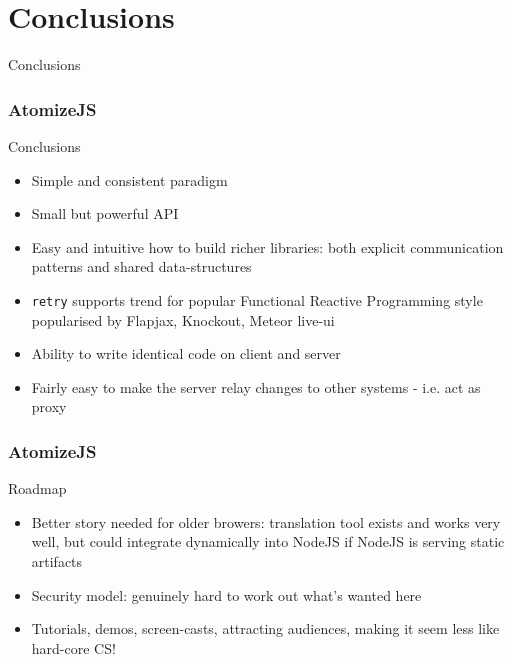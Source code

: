 \documentclass{beamer}
\begin{document}
\section{Conclusions}

\begin{frame}
  \centering
  \LARGE

  Conclusions

\end{frame}

\begin{frame}
  \frametitle{AtomizeJS}

  \begin{block}{Conclusions}
    \begin{itemize}
    \item
      Simple and consistent paradigm
    \item
      Small but powerful API
    \item
      Easy and intuitive how to build richer libraries: both explicit
      communication patterns and shared data-structures
    \item
      \texttt{retry} supports trend for popular Functional Reactive
      Programming style popularised by Flapjax, Knockout, Meteor
      live-ui
    \item
      Ability to write identical code on client and server
    \item
      Fairly easy to make the server relay changes to other systems -
      i.e. act as proxy
    \end{itemize}
  \end{block}
\end{frame}

\begin{frame}
  \frametitle{AtomizeJS}

  \begin{block}{Roadmap}
    \begin{itemize}
    \item
      Better story needed for older browers: translation tool exists
      and works very well, but could integrate dynamically into NodeJS
      if NodeJS is serving static artifacts
    \item
      Security model: genuinely hard to work out what's wanted here
    \item
      Tutorials, demos, screen-casts, attracting audiences, making it
      seem less like hard-core CS!
    \end{itemize}
  \end{block}
\end{frame}
\end{document}
